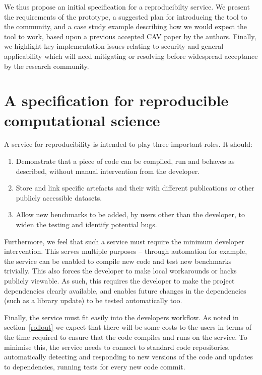\documentclass{llncs}
\begin{document}
We thus propose an initial specification for a reproducibilty
service. We present the requirements of the prototype, a suggested
plan for introducing the tool to the community, and a case study
example describing how we would expect the tool to work, based upon a
previous accepted CAV paper by the authors. Finally, we highlight key
implementation issues relating to security and general applicability
which will need mitigating or resolving before widespread acceptance
by the research community.

\section{A specification for reproducible computational science}\label{spec}

A service for reproducibility is intended to play three important roles. It should:
\begin{enumerate}
	\item Demonstrate that a piece of code can be compiled, run and behaves as described,
		without manual intervention from the developer.
	\item Store and link specific artefacts and their with different publications
		or other publicly accessible datasets.
	\item Allow new benchmarks to be added, by users other than the developer, to 
		widen the testing and identify potential bugs.
\end{enumerate}
 
Furthermore, we feel that such a service must require the minimum developer intervention.
This serves multiple purposes -- through automation for example, the service can be enabled to compile 
new code and test new benchmarks trivially. This also forces the developer to make local
workarounds or hacks publicly viewable. As such, this requires the developer to make the 
project dependencies clearly available, and enables future changes in the dependencies 
(such as a library update) to be tested automatically too. 

Finally, the service must fit easily into the developers workflow. As
noted in section~\ref{rollout} we expect that there will be some costs
to the users in terms of the time required to ensure that the code
compiles and runs on the service. To minimise this, the service needs
to connect to standard code repositories, automatically detecting and
responding to new versions of the code and updates to dependencies,
running tests for every new code commit.
\end{document}

